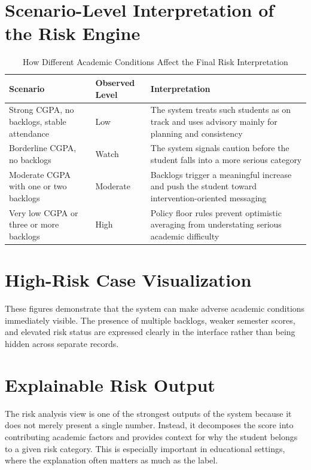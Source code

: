 \section{Scenario-Level Interpretation of the Risk Engine}
\begin{table}[H]
\centering
\caption{How Different Academic Conditions Affect the Final Risk Interpretation}
\begin{tabularx}{\textwidth}{>{\raggedright\arraybackslash}p{} >{\raggedright\arraybackslash}p{} >{\raggedright\arraybackslash}X}
\toprule
\textbf{Scenario} & \textbf{Observed Level} & \textbf{Interpretation} \\
\midrule
Strong CGPA, no backlogs, stable attendance & Low & The system treats such students as on track and uses advisory mainly for planning and consistency \\
Borderline CGPA, no backlogs & Watch & The system signals caution before the student falls into a more serious category \\
Moderate CGPA with one or two backlogs & Moderate & Backlogs trigger a meaningful increase and push the student toward intervention-oriented messaging \\
Very low CGPA or three or more backlogs & High & Policy floor rules prevent optimistic averaging from understating serious academic difficulty \\
\bottomrule
\end{tabularx}
\end{table}

\section{High-Risk Case Visualization}
These figures demonstrate that the system can make adverse academic conditions immediately visible. The presence of multiple backlogs, weaker semester scores, and elevated risk status are expressed clearly in the interface rather than being hidden across separate records.

\section{Explainable Risk Output}
The risk analysis view is one of the strongest outputs of the system because it does not merely present a single number. Instead, it decomposes the score into contributing academic factors and provides context for why the student belongs to a given risk category. This is especially important in educational settings, where the explanation often matters as much as the label.

